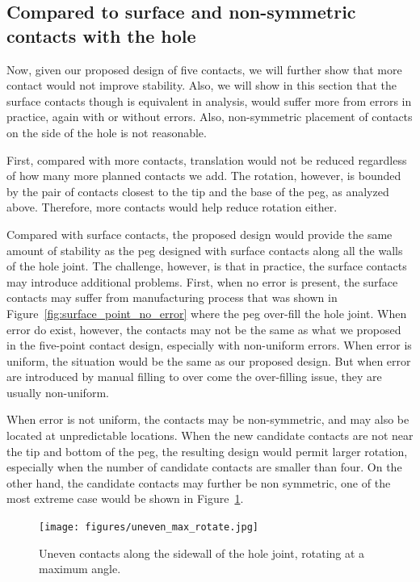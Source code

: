 \documentclass[11pt, twocolumn]{article}
\begin{document}
\subsection{Compared to surface and non-symmetric contacts with the hole}

Now, given our proposed design of five contacts, we will further show that more contact would not improve stability. Also, we will show in this section that the surface contacts though is equivalent in analysis, would suffer more from errors in practice, again with or without errors. Also, non-symmetric placement of contacts on the side of the hole is not reasonable. 

First, compared with more contacts, translation would not be reduced regardless of how many more planned contacts we add. The rotation, however, is bounded by the pair of contacts closest to the tip and the base of the peg, as analyzed above. Therefore, more contacts would help reduce rotation either. 

Compared with surface contacts, the proposed design would provide the same amount of stability as the peg designed with surface contacts along all the walls of the hole joint. The challenge, however, is that in practice, the surface contacts may introduce additional problems. First, when no error is present, the surface contacts may suffer from manufacturing process that was shown in Figure~\ref{fig:surface_point_no_error} where the peg over-fill the hole joint. When error do exist, however, the contacts may not be the same as what we proposed in the five-point contact design, especially with non-uniform errors. When error is uniform, the situation would be the same as our proposed design. But when error are introduced by manual filling to over come the over-filling issue, they are usually non-uniform. 

When error is not uniform, the contacts may be non-symmetric, and may also be located at unpredictable locations. When the new candidate contacts are not near the tip and bottom of the peg, the resulting design would permit larger rotation, especially when the number of candidate contacts are smaller than four. On the other hand, the candidate contacts may further be non symmetric, one of the most extreme case would be shown in Figure~\ref{fig:uneven_max_rotate}. 

\begin{figure}
\begin{center}
\texttt{[image: figures/uneven\_max\_rotate.jpg]}
\end{center}
\label{fig:uneven_max_rotate}
\caption{Uneven contacts along the sidewall of the hole joint, rotating at a maximum angle. }
\end{figure}
\end{document}
